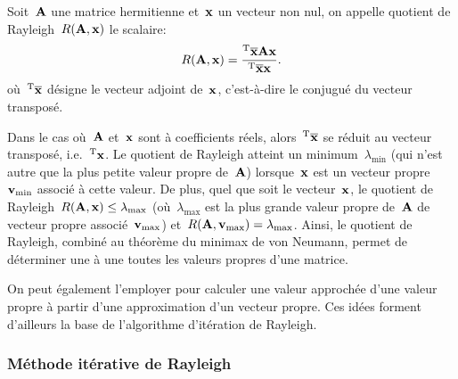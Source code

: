 \begin{definition}
Soit~$\MM{A}$ une matrice hermitienne et~$\VV{x}$ un vecteur non nul, on appelle quotient de Rayleigh~$R(\MM{A},\VV{x})$ le scalaire:
\begin{equation}
  R(\MM{A},\VV{x}) = \frac{\LL{\overline{x}} \MM{A} \VV{x}}{\LL{\overline{x}}\VV{x}}.
\end{equation}
où~${}^\mathrm{T}\mathbf{\overline{x}}$ désigne le vecteur adjoint de~$\VV{x}$, c'est-à-dire le conjugué du vecteur transposé.
\end{definition}

Dans le cas où~$\MM{A}$ et~$\VV{x}$ sont à coefficients réels, alors~${}^\mathrm{T}\mathbf{\overline{x}}$ se réduit au vecteur transposé, i.e.~${}^\mathrm{T}\mathbf{x}$.
\medskipvm
Le quotient de Rayleigh atteint un minimum~$\lambda_{\min}$ (qui n'est autre que la plus petite valeur propre de~$\MM{A}$) lorsque~$\VV{x}$ est un vecteur propre~$\VV{v}_{\min}$ associé à cette valeur.
\medskipvm
De plus, quel que soit le vecteur~$\VV{x}$, le quotient de Rayleigh~$R(\MM{A}, \VV{x}) \leq \lambda_{\max}$ (où~$\lambda_{\max}$ est la plus grande valeur propre de~$\MM{A}$ de vecteur propre associé~$\VV{v}_{\max}$) et~$R(\MM{A}, \VV{v}_{\max}) = \lambda_{\max}$. Ainsi, le quotient de Rayleigh, combiné au théorème du minimax de von Neumann, permet de déterminer une à une toutes les valeurs propres d'une matrice.

On peut également l'employer pour calculer une valeur approchée d'une valeur propre à partir d'une approximation d'un vecteur propre. Ces idées forment d'ailleurs la base de l'algorithme d'itération de Rayleigh.

\medskip
\subsubsection{Méthode itérative de Rayleigh}

